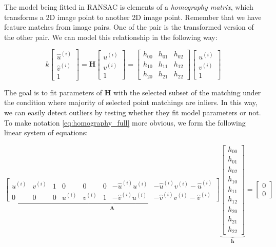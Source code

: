 \documentclass[a4paper]{report}
\numberwithin{figure}{section}
\begin{document}
\begin{appendices}
The model being fitted in 
RANSAC \parencite{Fischler1981b} is elements of a \textit{homography matrix}, 
which transforms a 2D 
image point to another 2D image point.  Remember that we have feature matches 
from image pairs. One of the pair is the transformed version of the other 
pair.  We can model this relationship in the following way:

\begin{equation}\label{eq:homography_full}
k
\begin{bmatrix}
\hat{u}^{(i)} \\ \hat{v}^{(i)} \\1
\end{bmatrix}
=
\mathbf{H}
\begin{bmatrix}
u^{(i)} \\ v^{(i)} \\1
\end{bmatrix}
=
\begin{bmatrix}
h_{00} & h_{01} & h_{02} \\
h_{10} & h_{11} & h_{12} \\
h_{20} & h_{21} & h_{22}
\end{bmatrix}
\begin{bmatrix}
u^{(i)} \\ v^{(i)} \\1
\end{bmatrix}
\end{equation}

The goal is to fit parameters of $\mathbf{H}$ with the selected subset of the 
matching under the condition where majority of selected point matchings are 
inliers. In this way, we can easily detect outliers by testing whether they 
fit model parameters or not. To make notation \eqref{eq:homography_full} 
more 
obvious, we form the following linear system of equations:

\begin{equation}
\underbrace{
	\begin{bmatrix}
	u^{(i)} & v^{(i)} & 1 & 0 & 0 & 0 & -\hat{u}^{(i)}u^{(i)} & 
	-\hat{u}^{(i)}v^{(i)} -\hat{u}^{(i)}\\
	0 & 0 & 0 & u^{(i)} & v^{(i)} & 1 & -\hat{v}^{(i)}u^{(i)} & 
	-\hat{v}^{(i)}v^{(i)} -\hat{v}^{(i)}
	\end{bmatrix}}_{\mathbf{A}}
\underbrace{
	\begin{bmatrix}
	h_{00} \\ h_{01} \\ h_{02} \\ h_{10} \\ h_{11} \\ h_{12} \\ h_{20} \\ 
	h_{21} \\ h_{22}
	\end{bmatrix}}_{\mathbf{h}}
= 
\begin{bmatrix}
0\\0
\end{bmatrix}
\end{equation}


\end{appendices}
\end{document}
